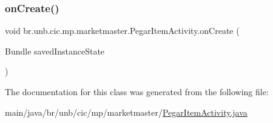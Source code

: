 \subsubsection{\texorpdfstring{on\+Create()}{onCreate()}}
{\footnotesize\ttfamily void br.\+unb.\+cic.\+mp.\+marketmaster.\+Pegar\+Item\+Activity.\+on\+Create (\begin{DoxyParamCaption}\item[{Bundle}]{saved\+Instance\+State }\end{DoxyParamCaption})\hspace{0.3cm}{\ttfamily [protected]}}



The documentation for this class was generated from the following file\+:\begin{DoxyCompactItemize}
\item 
main/java/br/unb/cic/mp/marketmaster/\mbox{\hyperlink{PegarItemActivity_8java}{Pegar\+Item\+Activity.\+java}}\end{DoxyCompactItemize}
